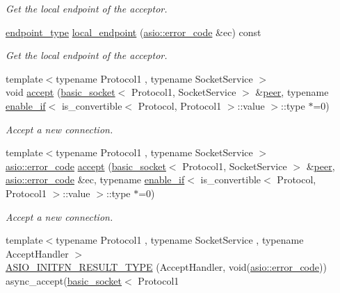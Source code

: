 \begin{DoxyCompactItemize}
\begin{DoxyCompactList}\small\item\em Get the local endpoint of the acceptor. \end{DoxyCompactList}\item 
\hyperlink{classasio_1_1basic__socket__acceptor_a393d69e2f8a370aaa13a9018af4c0048}{endpoint\+\_\+type} \hyperlink{classasio_1_1basic__socket__acceptor_a574cf608b846cedd689d4d2f49420f00}{local\+\_\+endpoint} (\hyperlink{classasio_1_1error__code}{asio\+::error\+\_\+code} \&ec) const 
\begin{DoxyCompactList}\small\item\em Get the local endpoint of the acceptor. \end{DoxyCompactList}\item 
{\footnotesize template$<$typename Protocol1 , typename Socket\+Service $>$ }\\void \hyperlink{classasio_1_1basic__socket__acceptor_a2eb949dd9a2c2df9b277d43fb5953329}{accept} (\hyperlink{classasio_1_1basic__socket}{basic\+\_\+socket}$<$ Protocol1, Socket\+Service $>$ \&\hyperlink{classasio_1_1basic__socket__acceptor_a140464f59d688d964abf760d11b30f94}{peer}, typename \hyperlink{structasio_1_1enable__if}{enable\+\_\+if}$<$ is\+\_\+convertible$<$ Protocol, Protocol1 $>$\+::value $>$\+::type $\ast$=0)
\begin{DoxyCompactList}\small\item\em Accept a new connection. \end{DoxyCompactList}\item 
{\footnotesize template$<$typename Protocol1 , typename Socket\+Service $>$ }\\\hyperlink{classasio_1_1error__code}{asio\+::error\+\_\+code} \hyperlink{classasio_1_1basic__socket__acceptor_a3b80b696ee25d20f3959511da05f5d4b}{accept} (\hyperlink{classasio_1_1basic__socket}{basic\+\_\+socket}$<$ Protocol1, Socket\+Service $>$ \&\hyperlink{classasio_1_1basic__socket__acceptor_a140464f59d688d964abf760d11b30f94}{peer}, \hyperlink{classasio_1_1error__code}{asio\+::error\+\_\+code} \&ec, typename \hyperlink{structasio_1_1enable__if}{enable\+\_\+if}$<$ is\+\_\+convertible$<$ Protocol, Protocol1 $>$\+::value $>$\+::type $\ast$=0)
\begin{DoxyCompactList}\small\item\em Accept a new connection. \end{DoxyCompactList}\item 
{\footnotesize template$<$typename Protocol1 , typename Socket\+Service , typename Accept\+Handler $>$ }\\\hyperlink{classasio_1_1basic__socket__acceptor_a2655c81c8150a6d9470ea318ab08b7ea}{A\+S\+I\+O\+\_\+\+I\+N\+I\+T\+F\+N\+\_\+\+R\+E\+S\+U\+L\+T\+\_\+\+T\+Y\+P\+E} (Accept\+Handler, void(\hyperlink{classasio_1_1error__code}{asio\+::error\+\_\+code})) async\+\_\+accept(\hyperlink{classasio_1_1basic__socket}{basic\+\_\+socket}$<$ Protocol1

\end{DoxyCompactItemize}
